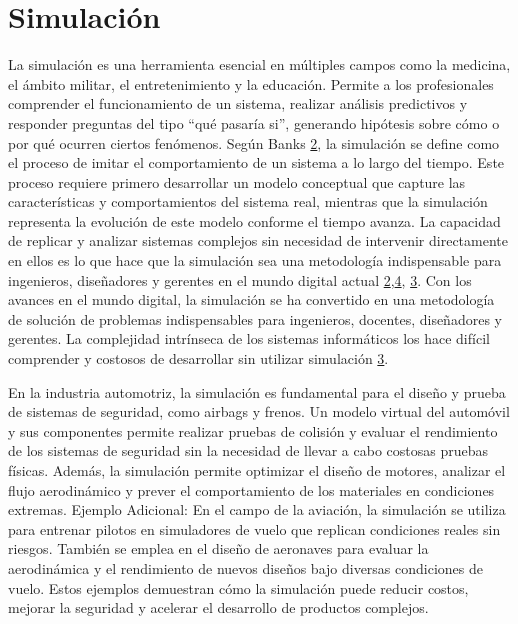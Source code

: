 \documentclass[12pt,twoside]{templates/unerthesis}
\begin{document}
\hypertarget{simulaciuxf3n}{%
\section{Simulación}\label{simulaciuxf3n}}

La simulación es una herramienta esencial en múltiples campos como la medicina, el ámbito militar, el entretenimiento y la educación. Permite a los profesionales comprender el funcionamiento de un sistema, realizar análisis predictivos y responder preguntas del tipo ``qué pasaría si'', generando hipótesis sobre cómo o por qué ocurren ciertos fenómenos. Según Banks \protect\hyperlink{ref-banks_discrete-event_2010}{2}, la simulación se define como el proceso de imitar el comportamiento de un sistema a lo largo del tiempo. Este proceso requiere primero desarrollar un modelo conceptual que capture las características y comportamientos del sistema real, mientras que la simulación representa la evolución de este modelo conforme el tiempo avanza. La capacidad de replicar y analizar sistemas complejos sin necesidad de intervenir directamente en ellos es lo que hace que la simulación sea una metodología indispensable para ingenieros, diseñadores y gerentes en el mundo digital actual \protect\hyperlink{ref-banks_discrete-event_2010}{2},\protect\hyperlink{ref-robinson_simulation_2014}{4}, \protect\hyperlink{ref-law_simulation_2015}{3}.
Con los avances en el mundo digital, la simulación se ha convertido en una metodología de solución de problemas indispensables para ingenieros, docentes, diseñadores y gerentes. La complejidad intrínseca de los sistemas informáticos los hace difícil comprender y costosos de desarrollar sin utilizar simulación \protect\hyperlink{ref-law_simulation_2015}{3}.

En la industria automotriz, la simulación es fundamental para el diseño y prueba de sistemas de seguridad, como airbags y frenos. Un modelo virtual del automóvil y sus componentes permite realizar pruebas de colisión y evaluar el rendimiento de los sistemas de seguridad sin la necesidad de llevar a cabo costosas pruebas físicas. Además, la simulación permite optimizar el diseño de motores, analizar el flujo aerodinámico y prever el comportamiento de los materiales en condiciones extremas.
Ejemplo Adicional:
En el campo de la aviación, la simulación se utiliza para entrenar pilotos en simuladores de vuelo que replican condiciones reales sin riesgos. También se emplea en el diseño de aeronaves para evaluar la aerodinámica y el rendimiento de nuevos diseños bajo diversas condiciones de vuelo. Estos ejemplos demuestran cómo la simulación puede reducir costos, mejorar la seguridad y acelerar el desarrollo de productos complejos.
\end{document}
